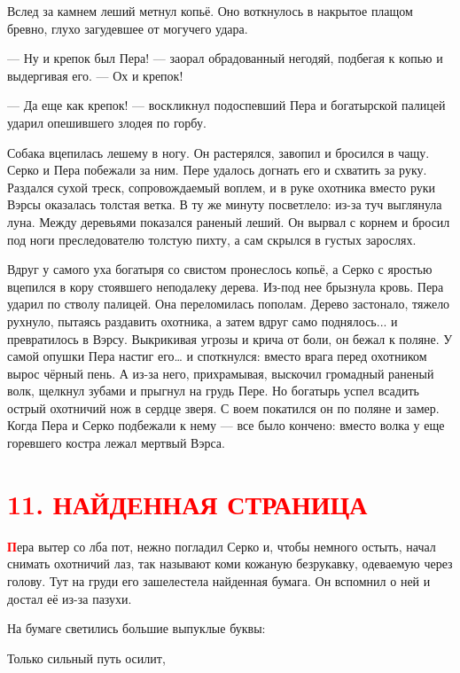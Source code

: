 \documentclass[12pt, a4paper, openany]{book}
\begin{document}
	Вслед за камнем леший метнул копьё. Оно воткнулось в накрытое плащом бревно, глухо загудевшее от могучего удара.
	
	— Ну и крепок был Пера! — заорал обрадованный негодяй, подбегая к копью и выдергивая его. — Ох и крепок!
	
	— Да еще как крепок! — воскликнул подоспевший Пера и богатырской палицей ударил опешившего злодея по горбу.
	
	Собака вцепилась лешему в ногу. Он растерялся, завопил и бросился в чащу. Серко и Пера побежали за ним. Пере удалось догнать его и схватить за руку. Раздался сухой треск, сопровождаемый воплем, и в руке охотника вместо руки Вэрсы оказалась толстая ветка. В ту же минуту посветлело: из-за туч выглянула луна. Между деревьями показался раненый леший. Он вырвал с корнем и бросил под ноги преследователю толстую пихту, а сам скрылся в густых зарослях.
	
	Вдруг у самого уха богатыря со свистом пронеслось копьё, а Серко с яростью вцепился в кору стоявшего неподалеку дерева. Из-под нее брызнула кровь. Пера ударил по стволу палицей. Она переломилась пополам. Дерево застонало, тяжело рухнуло, пытаясь раздавить охотника, а затем вдруг само поднялось... и превратилось в Вэрсу. Выкрикивая угрозы и крича от боли, он бежал к поляне. У самой опушки Пера настиг его… и споткнулся: вместо врага перед охотником вырос чёрный пень. А из-за него, прихрамывая, выскочил громадный раненый волк, щелкнул зубами и прыгнул на грудь Пере. Но богатырь успел всадить острый охотничий нож в сердце зверя. С воем покатился он по поляне и замер. Когда Пера и Серко подбежали к нему — все было кончено: вместо волка у еще горевшего костра лежал мертвый Вэрса.
	
	\section[11. Найденная страница]{\center \textcolor{red}{11. НАЙДЕННАЯ СТРАНИЦА}}

	
	\lettrine[findent=0pt]{\textbf{\textcolor{red}{П}}}{}ера вытер со лба пот, нежно погладил Серко и, чтобы немного остыть, начал снимать охотничий лаз, так называют коми кожаную безрукавку, одеваемую через голову. Тут на груди его зашелестела найденная бумага. Он вспомнил о ней и достал её из-за пазухи.
	
	На бумаге светились большие выпуклые буквы:
	
	
	
	
\qquad \qquad \qquad \qquad 	Только сильный путь осилит,
\end{document}
